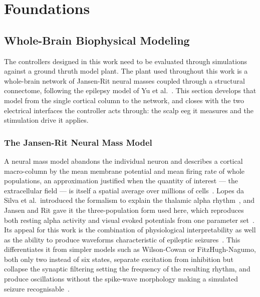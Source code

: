 \chapter{Foundations}
\label{ch:foundations}


\section{Whole-Brain Biophysical Modeling}

The controllers designed in this work need to be evaluated through simulations against a ground thruth model plant.
The plant used throughout this work is a whole-brain network of Jansen-Rit neural masses coupled
through a structural connectome, following the epilepsy model of Yu et al.~\cite{Yu2024}. %
This section develops that model from the single cortical column to the network, and closes with the two electrical interfaces the controller acts through: the scalp \ac{eeg} it measures and the stimulation drive it applies.

\subsection{The Jansen-Rit Neural Mass Model}

A neural mass model abandons the individual neuron and describes a cortical macro-column
by the mean membrane potential and mean firing rate of whole populations, an approximation
justified when the quantity of interest --- the extracellular field --- is itself a %
spatial average over millions of cells~\cite{LopesDaSilva1974,Buzsaki2012}. Lopes da Silva %
et al.\ introduced the formalism to explain the thalamic alpha rhythm~\cite{LopesDaSilva1974}, %
and Jansen and Rit gave it the three-population form used here, which reproduces both
resting alpha activity and visual evoked potentials from one parameter set~\cite{Jansen1995}. %
Its appeal for this work is the combination of physiological
interpretability as well as the ability to produce waveforms characteristic of epileptic seizures~\cite{Wendling2002,Yu2024}. %
This differentiates it from simpler models such as Wilson-Cowan or FitzHugh-Nagumo, both only two instead of six states, separate excitation from inhibition but collapse the synaptic filtering setting the frequency of the resulting
rhythm, and produce oscillations without the spike-wave morphology making a simulated
seizure recognisable~\cite{David2003}. %

